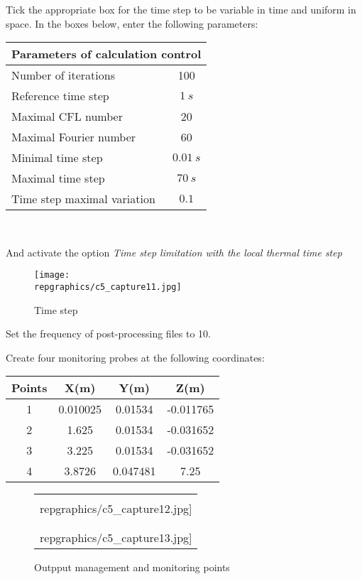 \newpage
Tick the appropriate box for the time step to be variable in time and uniform in
space. In the boxes below, enter the following parameters:
\begin{center}
\begin{tabular}{|l|c|}
\hline
\multicolumn{2}{|c|}{Parameters of calculation control} \\
\hline
Number of iterations & 100 \\
\hline
Reference time step & $1\ s$ \\
\hline
Maximal CFL number & 20 \\
\hline
Maximal Fourier number & 60 \\
\hline
Minimal time step & $0.01\ s$ \\
\hline
Maximal time step & $70\ s$ \\
\hline
Time step maximal variation & $0.1$ \\
\hline
\end{tabular}\\
\end{center}

And activate the option
{\itshape Time step limitation with the local thermal time step}

\begin{figure}[h!]
\begin{center}
\texttt{[image: \\repgraphics/c5\_capture11.jpg]}
\caption{Time step}
\label{fig11_e5}
\end{center}
\end{figure}


\newpage
Set the frequency of post-processing files to 10.

Create four monitoring probes at the following coordinates:
\begin{center}
\begin{tabular}{|c|c|c|c|}
\hline
Points & X(m) & Y(m) & Z(m)\\
\hline
1 & 0.010025 & 0.01534 & -0.011765 \\
\hline
2 & 1.625 & 0.01534 & -0.031652 \\
\hline
3 & 3.225 & 0.01534 & -0.031652 \\
\hline
4 & 3.8726 & 0.047481 & 7.25 \\
\hline
\end{tabular}
\end{center}

\begin{figure}[h!]
\begin{center}
\begin{tabular}{c}
\texttt{[image: \\repgraphics/c5\_capture12.jpg]} \\
\\
\texttt{[image: \\repgraphics/c5\_capture13.jpg]}
\end{tabular}
\caption{Outpput management and monitoring points}
\label{fig12_e5}
\end{center}
\end{figure}


